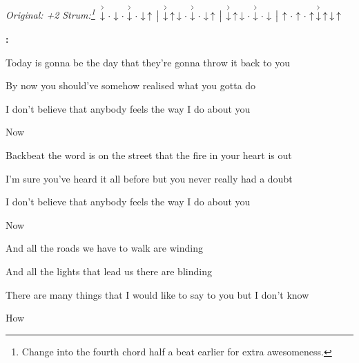 \begin{song}


\begin{headerbox}
\textit{Original: +2}
\quad
\textit{Strum:\footnote{Change into the fourth chord half a beat earlier for extra awesomeness.}}
$\AccentDown\Miss\Down\Miss\AccentDown\Miss\Down\Up \Separator
\AccentDown\Up\Down\Miss\AccentDown\Miss\Down\Up \Separator
\AccentDown\Up\Down\Miss\AccentDown\Miss\Down \Separator \Up 
\Miss\Up\Miss\Up\AccentDown\Up\Down\Up$ 
\end{headerbox}

\begin{hchordbox}
\end{hchordbox}

\bigskip

\Intro\textbf{:}      \par

\bigskip

 Today is gonna be the day that they're gonna throw it back to you \par
{} By now you should've somehow realised what you gotta do  \par
{}I don't believe that anybody feels the way I do about you \par
{}Now   \par

\bigskip

 Backbeat the word is on the street that the fire in your heart is out \par
{} I'm sure you've heard it all before but you never really had a doubt \par
{}I don't believe that anybody feels the way I do about you \par
{}Now    \par

\bigskip

And all the roads we have to walk are winding \par
And all the lights that lead us there are blinding \par
{}There are many things that I would like to say to you but I don't know \par
{}How \par


\end{song}
